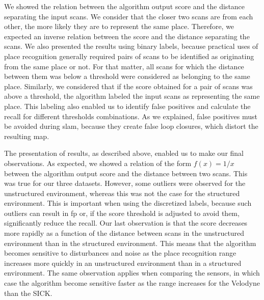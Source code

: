 
We showed the relation between the algorithm output score and the distance separating the input scans. We consider that the closer two scans are from each other, the more likely they are to represent the same place. Therefore, we expected an inverse relation between the score and the distance separating the scans. We also presented the results using binary labels, because practical uses of place recognition generally required pairs of scans to be identified as originating from the same place or not. For that matter, all scans for which the distance between them was below a threshold were considered as belonging to the same place. Similarly, we considered that if the score obtained for a pair of scans was above a threshold, the algorithm labeled the input scans as representing the same place. This labeling also enabled us to identify false positives and calculate the recall for different thresholds combinations. As we explained, false positives must be avoided during \gls*{slam}, because they create false loop closures, which distort the resulting map. 

The presentation of results, as described above, enabled us to make our final observations. As expected, we showed a relation of the form $f(x)=1/x$ between the algorithm output score and the distance between two scans. This was true for our three datasets. However, some outliers were observed for the unstructured environment, whereas this was not the case for the structured environment. This is important when using the discretized labels, because such outliers can result in \gls*{fp} or, if the score threshold is adjusted to avoid them, significantly reduce the recall. Our last observation is that the score decreases more rapidly as a function of the distance between scans in the unstructured environment than in the structured environment. This means that the algorithm becomes sensitive to disturbances and noise as the place recognition range increases more quickly in an unstructured environment than in a structured environment. The same observation applies when comparing the sensors, in which case the algorithm become sensitive faster as the range increases for the Velodyne than the SICK.

